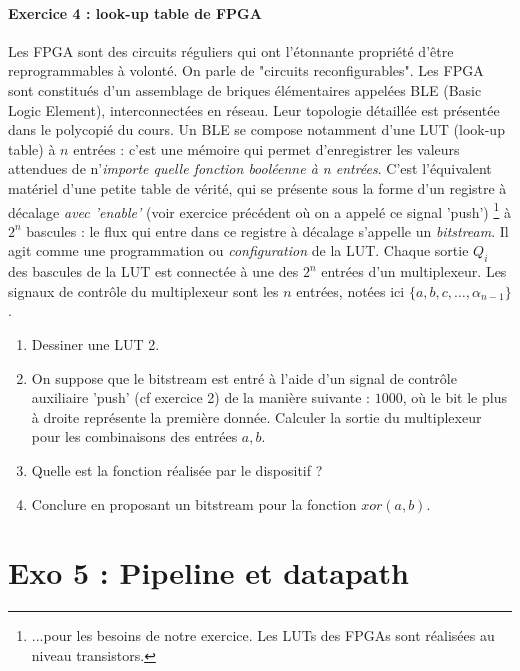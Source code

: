 \documentclass[a4paper,11pt]{article}
\begin{document}

\paragraph{Exercice 4 : look-up table de FPGA} Les FPGA sont des circuits réguliers qui ont l'étonnante propriété d'être
reprogrammables à volonté. On parle de "circuits reconfigurables".
Les FPGA sont constitués d'un assemblage de briques élémentaires appelées BLE (Basic Logic Element), interconnectées en réseau.
Leur topologie détaillée est présentée dans le polycopié du cours. Un BLE se compose notamment d'une
LUT (look-up table) à $n$ entrées : c'est une mémoire qui permet d'enregistrer
les valeurs attendues de n'{\it importe quelle fonction booléenne à n entrées}.
C'est l'équivalent matériel d'une petite table de vérité, qui se présente sous la forme d'un registre à décalage {\it avec 'enable'} (voir exercice précédent où on a appelé ce signal 'push')
\footnote{...pour les besoins de
notre exercice. Les LUTs des FPGAs sont réalisées au niveau transistors.}
à $2^n$ bascules : le flux qui entre dans ce registre à décalage s'appelle un {\it bitstream}.
Il agit comme une programmation  ou {\it configuration} de la LUT.
Chaque sortie $Q_i$ des bascules de la LUT est connectée à une des $2^n$ entrées d'un multiplexeur.
Les signaux de contrôle du multiplexeur sont les $n$ entrées, notées ici $\{a,b,c,\dots,\alpha_{n-1}\}$.

\begin{enumerate}
  \item Dessiner une LUT 2.
  \item On suppose que le bitstream est entré à l'aide d'un signal de contrôle auxiliaire 'push' (cf exercice 2) de la manière suivante : $1000$, où le bit le plus à droite représente la première
  donnée. Calculer la sortie du multiplexeur pour les combinaisons des entrées $a,b$.
  \item Quelle est la fonction réalisée par le dispositif ?
  \item Conclure en proposant un bitstream pour la fonction $xor(a,b)$.
\end{enumerate}

\section{Exo 5 : Pipeline et datapath}
\end{document}
